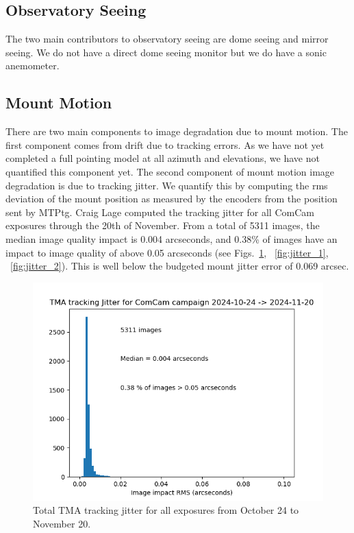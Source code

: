 \subsection{Observatory Seeing}

The two main contributors to observatory seeing are dome seeing and mirror seeing. We do not have a direct dome seeing monitor but we do have a sonic anemometer.

\subsection{Mount Motion}

There are two main components to image degradation due to mount motion. The first component comes from drift due to tracking errors. As we have not yet completed a full pointing model at all azimuth and elevations, we have not quantified this component yet. The second component of mount motion image degradation is due to tracking jitter. We quantify this by computing the rms deviation of the mount position as measured by the encoders from the position sent by MTPtg. Craig Lage computed the tracking jitter for all ComCam exposures through the 20th of November. From a total of 5311 images, the median image quality impact is 0.004 arcseconds, and 0.38\% of images have an impact to image quality of above 0.05 arcseconds (see Figs.~\ref{fig:jitter}, ~\ref{fig:jitter_1}, ~\ref{fig:jitter_2}). This is well below the budgeted mount jitter error of 0.069 arcsec.

\begin{figure}
  \label{fig:jitter}
  \includegraphics[width=\linewidth]{image_quality_figures/ComCam_Mount_Jitter_21Nov24.png}
  \caption{Total TMA tracking jitter for all exposures from October 24 to November 20.}
\end{figure}

